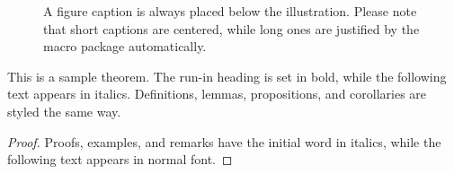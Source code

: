 \begin{figure}
	\caption{A figure caption is always placed below the illustration.
		Please note that short captions are centered, while long ones are
		justified by the macro package automatically.} \label{fig1}
\end{figure}

\begin{theorem}
	This is a sample theorem. The run-in heading is set in bold, while
	the following text appears in italics. Definitions, lemmas,
	propositions, and corollaries are styled the same way.
\end{theorem}
%
%
\begin{proof}
	Proofs, examples, and remarks have the initial word in italics,
	while the following text appears in normal font.
\end{proof}